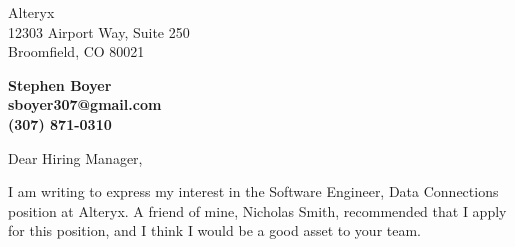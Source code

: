 \documentclass[11pt]{letter} %
\begin{document}

\begin{letter}{
Alteryx \\
12303 Airport Way, Suite 250 \\
Broomfield, CO 80021 } 


\begin{center}
\large\bf Stephen Boyer \\ %
sboyer307@gmail.com \\ (307) 871-0310
\end{center} 

\signature{Stephen Boyer} %


\opening{Dear Hiring Manager,} 
 
I am writing to express my interest in the Software Engineer, Data Connections position at Alteryx. A friend of mine, Nicholas Smith, recommended that I apply for this position, and I think I would be a good asset to your team.




\end{letter}
\end{document}
